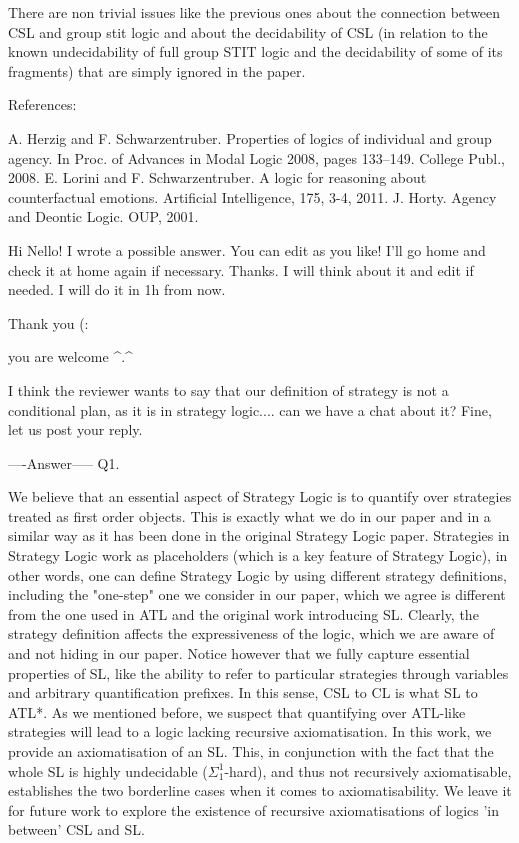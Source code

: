 There are non trivial issues like the previous ones about the connection between CSL and group stit logic and about the decidability of CSL (in relation to the known undecidability of full group STIT logic and the decidability of some of its fragments) that are simply ignored in the paper.

References:

A. Herzig and F. Schwarzentruber. Properties of logics of individual and group agency. In Proc. of Advances in Modal Logic 2008, pages 133–149. College Publ., 2008.
E. Lorini and F. Schwarzentruber. A logic for reasoning about counterfactual emotions. Artificial Intelligence, 175, 3-4, 2011.
J. Horty. Agency and Deontic Logic. OUP, 2001.


Hi Nello! I wrote a possible answer. You can edit as you like! I'll go home and check it at home again if necessary. 
Thanks. I will think about it and edit if needed. I will do it in 1h from now.

Thank you (:

you are welcome ^.^

I think the reviewer wants to say that our definition of strategy is not a conditional plan, as it is in strategy logic.... can we have a chat about it?
Fine, let us post your reply.

----Answer-----
Q1. 

We believe that an essential aspect of Strategy Logic is to quantify over strategies treated as first order objects. This is exactly what we do in our paper and in a similar way as it has been done in the original Strategy Logic paper. Strategies in Strategy Logic work as placeholders (which is a key feature of Strategy Logic), in other words, one can define Strategy Logic by using different strategy definitions, including the "one-step" one we consider in our paper, which we agree is different from the one used in ATL and the original work introducing SL. Clearly, the strategy definition affects the expressiveness of the logic, which we are aware of and not hiding in our paper. Notice however that we fully capture essential properties of SL, like the ability to refer to particular strategies through variables and arbitrary quantification prefixes. In this sense, CSL to CL is what SL to ATL*. As we mentioned before, we suspect that quantifying over ATL-like strategies will lead to a logic lacking recursive axiomatisation. In this work, we provide an axiomatisation of an SL. This, in conjunction with the fact that the whole SL is highly undecidable ($\Sigma^1_1$-hard), and thus not recursively axiomatisable, establishes the two borderline cases when it comes to axiomatisability. We leave it for future work to explore the existence of recursive axiomatisations of logics 'in between' CSL and SL. 
 




